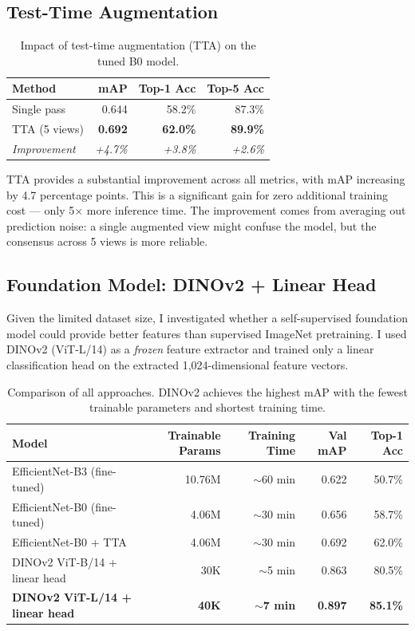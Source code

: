 \documentclass[11pt, a4paper]{article}
\begin{document}
\subsection{Test-Time Augmentation}

\begin{table}[H]
\centering
\caption{Impact of test-time augmentation (TTA) on the tuned B0 model.}
\begin{tabular}{lrrr}
\toprule
Method & mAP & Top-1 Acc & Top-5 Acc \\
\midrule
Single pass & 0.644 & 58.2\% & 87.3\% \\
TTA (5 views) & \textbf{0.692} & \textbf{62.0\%} & \textbf{89.9\%} \\
\midrule
\textit{Improvement} & \textit{+4.7\%} & \textit{+3.8\%} & \textit{+2.6\%} \\
\bottomrule
\end{tabular}
\label{tab:tta}
\end{table}

TTA provides a substantial improvement across all metrics, with mAP increasing by 4.7 percentage points. This is a significant gain for zero additional training cost --- only 5$\times$ more inference time. The improvement comes from averaging out prediction noise: a single augmented view might confuse the model, but the consensus across 5 views is more reliable.

\subsection{Foundation Model: DINOv2 + Linear Head}

Given the limited dataset size, I investigated whether a self-supervised foundation model could provide better features than supervised ImageNet pretraining. I used DINOv2 (ViT-L/14) \cite{dinov2} as a \textit{frozen} feature extractor and trained only a linear classification head on the extracted 1{,}024-dimensional feature vectors.

\begin{table}[H]
\centering
\caption{Comparison of all approaches. DINOv2 achieves the highest mAP with the fewest trainable parameters and shortest training time.}
\begin{tabular}{lrrrr}
\toprule
Model & Trainable Params & Training Time & Val mAP & Top-1 Acc \\
\midrule
EfficientNet-B3 (fine-tuned) & 10.76M & $\sim$60 min & 0.622 & 50.7\% \\
EfficientNet-B0 (fine-tuned) & 4.06M & $\sim$30 min & 0.656 & 58.7\% \\
EfficientNet-B0 + TTA & 4.06M & $\sim$30 min & 0.692 & 62.0\% \\
DINOv2 ViT-B/14 + linear head & 30K & $\sim$5 min & 0.863 & 80.5\% \\
\textbf{DINOv2 ViT-L/14 + linear head} & \textbf{40K} & \textbf{$\sim$7 min} & \textbf{0.897} & \textbf{85.1\%} \\
\bottomrule
\end{tabular}
\label{tab:all_models}
\end{table}
\end{document}
